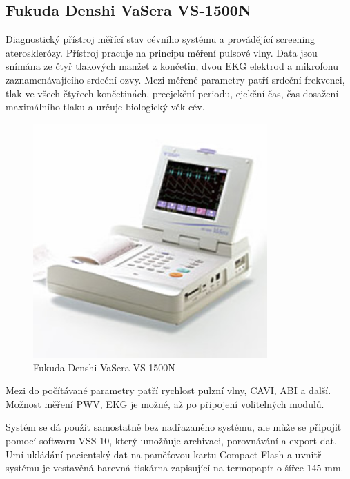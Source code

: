 \subsection{Fukuda Denshi VaSera VS-1500N}
Diagnostický přístroj měřící stav cévního systému a provádějící screening aterosklerózy. Přístroj pracuje na principu měření pulsové vlny. Data jsou snímána ze čtyř tlakových manžet z končetin, dvou EKG elektrod a mikrofonu zaznamenávajícího srdeční ozvy.
Mezi měřené parametry patří srdeční frekvenci, tlak ve všech čtyřech končetinách, preejekční periodu, ejekční čas, čas dosažení maximálního tlaku a určuje biologický věk cév.
\begin{figure}[H]
    \caption{Fukuda Denshi VaSera VS-1500N \cite{cite:Arteriograph}}
    \includegraphics[width=0.8\textwidth]{pictures/vs_1500n.jpg}
\end{figure}
Mezi do počítávané parametry patří rychlost pulzní vlny, CAVI, ABI a další. Možnost měření PWV, EKG je možné, až po připojení volitelných modulů.
\par
Systém se dá použít samostatně bez nadřazaného systému, ale může se připojit pomocí softwaru VSS-10, který umožňuje archivaci, porovnávání a export dat. Umí ukládání pacientský dat na paměťovou kartu Compact Flash a uvnitř systému je
vestavěná barevná tiskárna zapisující na termopapír o šířce 145 mm.
